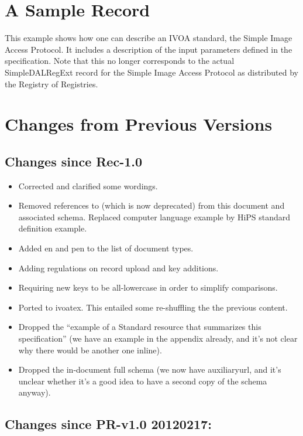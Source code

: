 \documentclass[11pt,a4paper]{ivoa}
\begin{document}
\appendix

\section{A Sample Record}
\label{app:fullrecord}

This example shows how one can describe an IVOA standard, the Simple
Image Access Protocol.  It includes a description of the input parameters
defined in the specification.  Note that this no longer corresponds to
the actual SimpleDALRegExt record for the Simple Image Access Protocol
as distributed by the Registry of Registries.



\section{Changes from Previous Versions}

\subsection{Changes since Rec-1.0}

\begin{itemize}
\item Corrected and clarified some wordings.
\item Removed references to  (which is now deprecated)
from this document and associated schema.
Replaced computer language example by HiPS standard definition example.
\item Added en and pen to the list of document types.
\item Adding regulations on record upload and key additions.
\item Requiring new keys to be all-lowercase in order to simplify
comparisons.
\item Ported to ivoatex.  This entailed some re-shuffling the the
previous content.
\item Dropped the ``example of a Standard resource that summarizes this
specification'' (we have an example in the appendix already, and it's
not clear why there would be another one inline).
\item Dropped the in-document full schema (we now have auxiliaryurl, and
it's unclear whether it's a good idea to have a second copy of the
schema anyway).
\end{itemize}

\subsection{Changes since PR-v1.0 20120217:}
\end{document}

